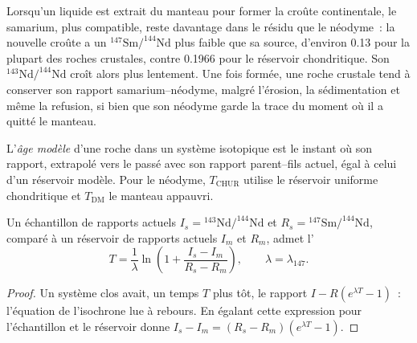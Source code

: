 Lorsqu'un liquide est extrait du manteau pour former la croûte continentale, le samarium,
plus compatible, reste davantage dans le résidu que le néodyme~: la nouvelle croûte a un
$^{147}\mathrm{Sm}/^{144}\mathrm{Nd}$ plus faible que sa source, d'environ 0.13 pour la plupart
des roches crustales, contre 0.1966 pour le réservoir chondritique. Son
$^{143}\mathrm{Nd}/^{144}\mathrm{Nd}$ croît alors plus lentement. Une fois formée, une
roche crustale tend à conserver son rapport samarium--néodyme, malgré l'érosion,
la sédimentation et même la refusion, si bien que son néodyme garde la trace du moment où il a quitté le
manteau.

\begin{definition}\label{def:b3:advanced-geochronology:model-age}
L'\emph{âge modèle} d'une roche dans un système isotopique est le
instant où son rapport, extrapolé vers le passé avec son rapport parent--fils actuel,
égal à celui d'un réservoir modèle. Pour le néodyme, $T_{\mathrm{CHUR}}$
utilise le réservoir uniforme chondritique et $T_{\mathrm{DM}}$ le manteau
appauvri.
\end{definition}

\begin{theorem}\label{thm:b3:advanced-geochronology:model-age}
Un échantillon de rapports actuels $I_s = {}^{143}\mathrm{Nd}/^{144}\mathrm{Nd}$ et
$R_s = {}^{147}\mathrm{Sm}/^{144}\mathrm{Nd}$, comparé à un réservoir de
rapports actuels $I_m$ et $R_m$, admet l'
\[
T = \frac1\lambda\ln\left(1 + \frac{I_s - I_m}{R_s - R_m}\right),
\qquad \lambda = \lambda_{147}.
\]
\end{theorem}

\begin{proof}
Un système clos avait, un temps $T$ plus tôt, le rapport $I - R(e^{\lambda T} - 1)$~:
l'équation de l'isochrone lue à rebours. En égalant cette expression pour l'échantillon et le
réservoir donne $I_s - I_m = (R_s - R_m)(e^{\lambda T} - 1)$.
\end{proof}

